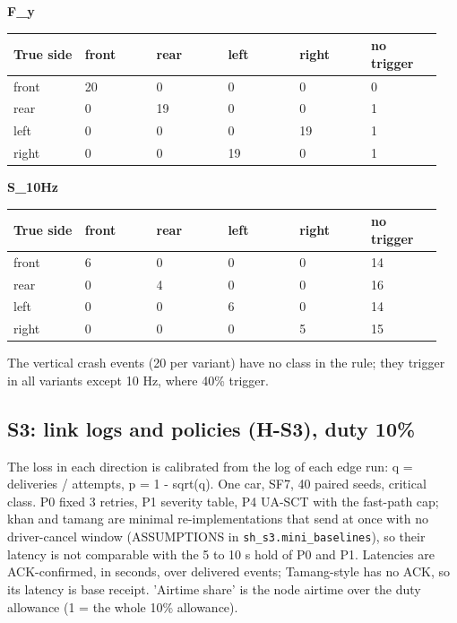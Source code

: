 \textbf{F\_y}

{\scriptsize\raggedright
\begin{longtable}{p{0.158\linewidth}p{0.158\linewidth}p{0.158\linewidth}p{0.158\linewidth}p{0.158\linewidth}p{0.158\linewidth}}
\toprule
True side & front & rear & left & right & no trigger \\
\midrule
\endhead
front & 20 & 0 & 0 & 0 & 0 \\
rear & 0 & 19 & 0 & 0 & 1 \\
left & 0 & 0 & 0 & 19 & 1 \\
right & 0 & 0 & 19 & 0 & 1 \\
\bottomrule
\end{longtable}}

\textbf{S\_10Hz}

{\scriptsize\raggedright
\begin{longtable}{p{0.158\linewidth}p{0.158\linewidth}p{0.158\linewidth}p{0.158\linewidth}p{0.158\linewidth}p{0.158\linewidth}}
\toprule
True side & front & rear & left & right & no trigger \\
\midrule
\endhead
front & 6 & 0 & 0 & 0 & 14 \\
rear & 0 & 4 & 0 & 0 & 16 \\
left & 0 & 0 & 6 & 0 & 14 \\
right & 0 & 0 & 0 & 5 & 15 \\
\bottomrule
\end{longtable}}

The vertical crash events (20 per variant) have no class in the rule; they trigger in all variants except 10 Hz, where 40\% trigger.

\subsection*{S3: link logs and policies (H-S3), duty 10\%}

The loss in each direction is calibrated from the log of each edge run: q = deliveries / attempts, p = 1 - sqrt(q). One car, SF7, 40 paired seeds, critical class. P0 fixed 3 retries, P1 severity table, P4 UA-SCT with the fast-path cap; khan and tamang are minimal re-implementations that send at once with no driver-cancel window (ASSUMPTIONS in \texttt{sh\_s3.mini\_baselines}), so their latency is not comparable with the 5 to 10 s hold of P0 and P1. Latencies are ACK-confirmed, in seconds, over delivered events; Tamang-style has no ACK, so its latency is base receipt. 'Airtime share' is the node airtime over the duty allowance (1 = the whole 10\% allowance).

